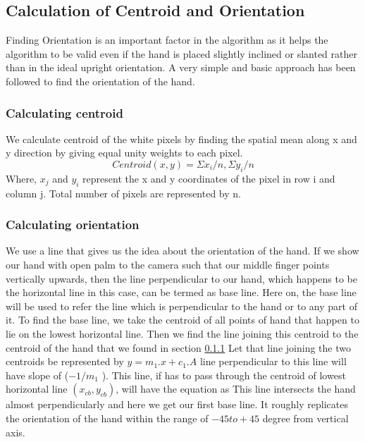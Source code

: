 \subsection{Calculation of Centroid and Orientation}
Finding Orientation is an important factor in the algorithm as it helps the algorithm to be valid
even if the hand is placed slightly inclined or slanted rather than in the ideal upright orientation. A very simple and basic approach has been followed to find the orientation of the hand. 
\subsubsection{Calculating centroid} \label{sssec:cc}
We calculate centroid of the white pixels by finding the spatial mean along x and y direction by
giving equal unity weights to each pixel.
$$ Centroid(x, y) = \Sigma x_i / n, \Sigma y_i / n  $$
Where, $x_j$ and $y_i$ represent the x and y coordinates of the pixel in row i and column j. Total
number of pixels are represented by n.
\subsubsection{Calculating orientation}
We use a line that gives us the idea about the orientation of the hand. If we show our hand with
open palm to the camera such that our middle finger points vertically upwards, then the line
perpendicular to our hand, which happens to be the horizontal line in this case, can be termed as
base line. Here on, the base line will be used to refer the line which is perpendicular to the hand or to any part of it. \newline
To find the base line, we take the centroid of all points of hand that happen to lie on the lowest
horizontal line. Then we find the line joining this centroid to the centroid of the hand that we
found in section \ref{sssec:cc} Let that line joining the two centroids be represented by $y = m_1.x + c_1.A$
line perpendicular to this line will have slope of ($-1/m_1$ ). This line, if has to pass through the
centroid of lowest horizontal line $(x_{cb} , y_{cb} )$, will have the equation as
This line intersects the hand almost perpendicularly and here we get our first base line. It roughly
replicates the orientation of the hand within the range of $-45 to +45$ degree from vertical axis\cite{dey2014algorithm}.  

